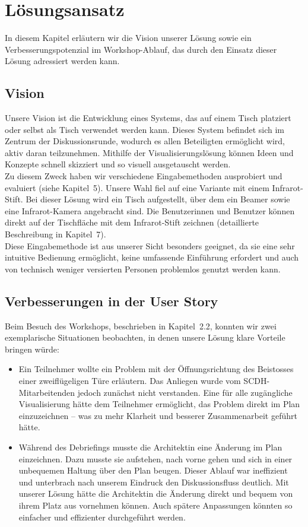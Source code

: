 \section{Lösungsansatz}
In diesem Kapitel erläutern wir die Vision unserer Lösung sowie ein Verbesserungspotenzial im Workshop-Ablauf, das durch den Einsatz dieser Lösung adressiert werden kann.

\subsection{Vision}
Unsere Vision ist die Entwicklung eines Systems, das auf einem Tisch platziert oder selbst als Tisch verwendet werden kann. Dieses System befindet sich im Zentrum der Diskussionsrunde, wodurch es allen Beteiligten ermöglicht wird, aktiv daran teilzunehmen. Mithilfe der Visualisierungslösung können Ideen und Konzepte schnell skizziert und so visuell ausgetauscht werden.\\

Zu diesem Zweck haben wir verschiedene Eingabemethoden ausprobiert und evaluiert (siehe Kapitel~5). Unsere Wahl fiel auf eine Variante mit einem Infrarot-Stift. Bei dieser Lösung wird ein Tisch aufgestellt, über dem ein Beamer sowie eine Infrarot-Kamera angebracht sind. Die Benutzerinnen und Benutzer können direkt auf der Tischfläche mit dem Infrarot-Stift zeichnen (detaillierte Beschreibung in Kapitel~7).\\

Diese Eingabemethode ist aus unserer Sicht besonders geeignet, da sie eine sehr intuitive Bedienung ermöglicht, keine umfassende Einführung erfordert und auch von technisch weniger versierten Personen problemlos genutzt werden kann.

\subsection{Verbesserungen in der User Story}
Beim Besuch des Workshops, beschrieben in Kapitel~2.2, konnten wir zwei exemplarische Situationen beobachten, in denen unsere Lösung klare Vorteile bringen würde:

\begin{itemize}
    \item Ein Teilnehmer wollte ein Problem mit der Öffnungsrichtung des Beistosses einer zweiflügeligen Türe erläutern. Das Anliegen wurde vom SCDH-Mitarbeitenden jedoch zunächst nicht verstanden. Eine für alle zugängliche Visualisierung hätte dem Teilnehmer ermöglicht, das Problem direkt im Plan einzuzeichnen – was zu mehr Klarheit und besserer Zusammenarbeit geführt hätte.
    
    \item Während des Debriefings musste die Architektin eine Änderung im Plan einzeichnen. Dazu musste sie aufstehen, nach vorne gehen und sich in einer unbequemen Haltung über den Plan beugen. Dieser Ablauf war ineffizient und unterbrach nach unserem Eindruck den Diskussionsfluss deutlich. Mit unserer Lösung hätte die Architektin die Änderung direkt und bequem von ihrem Platz aus vornehmen können. Auch spätere Anpassungen könnten so einfacher und effizienter durchgeführt werden.
\end{itemize}


